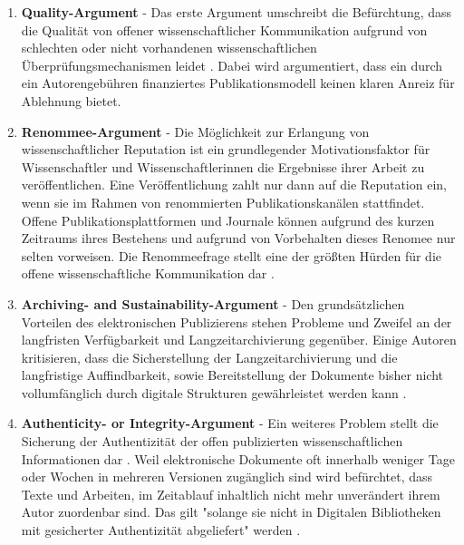 \begin{enumerate}
\item \textbf{Quality-Argument} - Das erste Argument umschreibt die Befürchtung, dass die Qualität von offener wissenschaftlicher Kommunikation aufgrund von schlechten oder nicht vorhandenen wissenschaftlichen Überprüfungsmechanismen leidet \cite{Chibnik_2015} \cite{Beall_2012}. Dabei wird argumentiert, dass ein durch ein Autorengebühren finanziertes Publikationsmodell keinen klaren Anreiz für Ablehnung bietet.
\item \textbf{Renommee-Argument} - Die Möglichkeit zur Erlangung von wissenschaftlicher Reputation ist ein grundlegender Motivationsfaktor für Wissenschaftler und Wissenschaftlerinnen die Ergebnisse ihrer Arbeit zu veröffentlichen. Eine Veröffentlichung zahlt nur dann auf die Reputation ein, wenn sie im Rahmen von renommierten Publikationskanälen stattfindet. Offene Publikationsplattformen und Journale können aufgrund des kurzen Zeitraums ihres Bestehens und aufgrund von Vorbehalten dieses Renomee nur selten vorweisen. Die Renommeefrage stellt eine der größten Hürden für die offene wissenschaftliche Kommunikation dar \cite{weishaupt_2009_goldenOA} \cite{Woelfle_2011}.
\item \textbf{Archiving- and Sustainability-Argument} - Den grundsätzlichen Vorteilen des elektronischen Publizierens stehen Probleme und Zweifel an der langfristen Verfügbarkeit und Langzeitarchivierung \cite{weishaupt_2009_goldenOA} gegenüber. Einige Autoren kritisieren, dass die Sicherstellung der Langzeitarchivierung und die langfristige Auffindbarkeit, sowie Bereitstellung der Dokumente bisher nicht vollumfänglich durch digitale Strukturen gewährleistet werden kann \cite{umstatter_2007_qualitatssicherung} \cite{Gersmann_2007}.
\item \textbf{Authenticity- or Integrity-Argument} - Ein weiteres Problem stellt die Sicherung der Authentizität der offen publizierten wissenschaftlichen Informationen dar \cite{umstatter_2007_qualitatssicherung} \cite{weishaupt_2009_goldenOA} \cite{grand_2012_open}. Weil elektronische Dokumente oft innerhalb weniger Tage oder Wochen in mehreren Versionen zugänglich sind wird befürchtet, dass Texte und Arbeiten, im Zeitablauf inhaltlich nicht mehr unverändert ihrem Autor zuordenbar sind. Das gilt "solange sie nicht in Digitalen Bibliotheken mit gesicherter Authentizität abgeliefert" werden \cite{umstatter_2007_qualitatssicherung}.

\end{enumerate}
